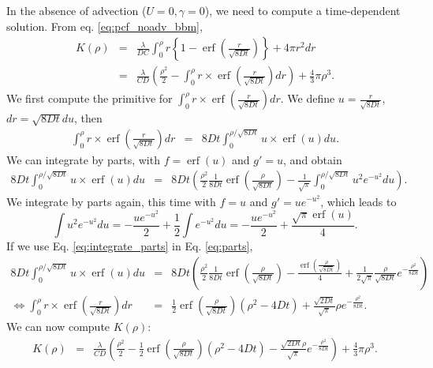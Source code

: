 \documentclass[12pt,english]{article}
\DeclareMathOperator\erf{erf}
\begin{document}
In the absence of advection ($U=0,\gamma=0$), we need to compute
a time-dependent solution. From eq. \ref{eq:pcf_noadv_bbm}, 
\begin{equation}
\begin{array}{ccc}
K(\rho) & = & \frac{\lambda}{DC}\int_{0}^{\rho}r\left\{ 1-\erf\left(\frac{r}{\sqrt{8Dt}}\right)\right\} +4\pi r^{2}dr\\
 & = & \frac{\lambda}{CD}\left(\frac{\rho^{2}}{2}-\int_{0}^{\rho}r\times\erf\left(\frac{r}{\sqrt{8Dt}}\right)dr\right)+\frac{4}{3}\pi\rho^{3}.
\end{array}\label{eq:start_K_intra_no_adv}
\end{equation}
We first compute the primitive for $\int_{0}^{\rho}r\times\erf\left(\frac{r}{\sqrt{8Dt}}\right)dr$.
We define $u=\frac{r}{\sqrt{8Dt}}$, $dr=\sqrt{8Dt}du$, then 
\begin{equation}
\begin{array}{ccc}
\int_{0}^{\rho}r\times\erf\left(\frac{r}{\sqrt{8Dt}}\right)dr & = & 8Dt\int_{0}^{\rho/\sqrt{8Dt}}u\times\erf\left(u\right)du.\end{array}
\end{equation}
We can integrate by parts, with $f=\erf(u)$ and $g'=u$, and obtain
\begin{equation}
\begin{array}{ccc}
8Dt\int_{0}^{\rho/\sqrt{8Dt}}u\times\erf\left(u\right)du & = & 8Dt\left(\frac{\rho^{2}}{2}\frac{1}{8Dt}\erf(\frac{\rho}{\sqrt{8Dt}})-\frac{1}{\sqrt{\pi}}\int_{0}^{\rho/\sqrt{8Dt}}u^{2}e^{-u^{2}}du\right).\end{array}\label{eq:parts}
\end{equation}
We integrate by parts again, this time with $f=u$ and $g'=ue^{-u^{2}}$,
which leads to 
\begin{equation}
\int u^{2}e^{-u^{2}}du=-\frac{ue^{-u^{2}}}{2}+\frac{1}{2}\int e^{-u^{2}}du=-\frac{ue^{-u^{2}}}{2}+\frac{\sqrt{\pi}\erf(u)}{4}.\label{eq:integrate_parts}
\end{equation}
If we use Eq. \ref{eq:integrate_parts} in Eq. \ref{eq:parts}, 
\begin{equation}
\begin{array}{ccc}
8Dt\int_{0}^{\rho/\sqrt{8Dt}}u\times\erf\left(u\right)du & = & 8Dt\left(\frac{\rho^{2}}{2}\frac{1}{8Dt}\erf(\frac{\rho}{\sqrt{8Dt}})-\frac{\erf(\frac{\rho}{\sqrt{8Dt}})}{4}+\frac{1}{2\sqrt{\pi}}\frac{\rho}{\sqrt{8Dt}}e^{-\frac{\rho^{2}}{8Dt}}\right)\\
\Leftrightarrow\int_{0}^{\rho}r\times\erf\left(\frac{r}{\sqrt{8Dt}}\right)dr & = & \frac{1}{2}\erf(\frac{\rho}{\sqrt{8Dt}})(\rho^{2}-4Dt)+\frac{\sqrt{2Dt}}{\sqrt{\pi}}\rho e^{-\frac{\rho^{2}}{8Dt}}.
\end{array}
\end{equation}
We can now compute $K(\rho)$: 
\begin{equation}
\begin{array}{ccc}
K(\rho) & = & \frac{\lambda}{CD}\left(\frac{\rho^{2}}{2}-\frac{1}{2}\erf(\frac{\rho}{\sqrt{8Dt}})(\rho^{2}-4Dt)-\frac{\sqrt{2Dt}\rho}{\sqrt{\pi}}e^{-\frac{\rho^{2}}{8Dt}}\right)+\frac{4}{3}\pi\rho^{3}.\end{array}\label{eq:end_K}
\end{equation}

 

\end{document}
